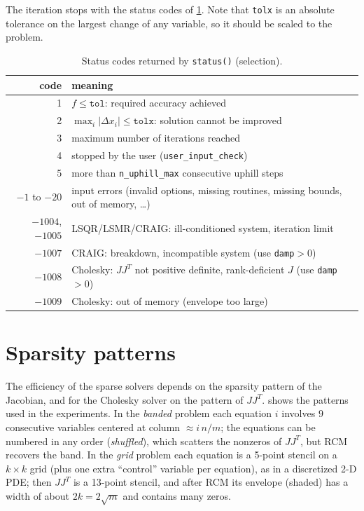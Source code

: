\documentclass[11pt]{article}
\newcommand{\code}[1]{\texttt{#1}}
\begin{document}
The iteration stops with the status codes of \cref{tab:status}. Note that \code{tolx} is an absolute
tolerance on the largest change of any variable, so it should be scaled to the problem.

\begin{table}[htbp]
\centering
\caption{Status codes returned by \code{status()} (selection).}
\label{tab:status}
\small
\begin{tabular}{@{}rl@{}}
\toprule
code & meaning \\
\midrule
1 & $f \le \code{tol}$: required accuracy achieved \\
2 & $\max_i |\Delta x_i| \le \code{tolx}$: solution cannot be improved \\
3 & maximum number of iterations reached \\
4 & stopped by the user (\code{user\_input\_check}) \\
5 & more than \code{n\_uphill\_max} consecutive uphill steps \\
$-1$ to $-20$ & input errors (invalid options, missing routines, missing bounds, out of memory, \ldots) \\
$-1004$, $-1005$ & LSQR/LSMR/CRAIG: ill-conditioned system, iteration limit \\
$-1007$ & CRAIG: breakdown, incompatible system (use \code{damp}${}>0$) \\
$-1008$ & Cholesky: $JJ^T$ not positive definite, rank-deficient $J$ (use \code{damp}${}>0$) \\
$-1009$ & Cholesky: out of memory (envelope too large) \\
\bottomrule
\end{tabular}
\end{table}

\section{Sparsity patterns}
\label{sec:sparsity}

The efficiency of the sparse solvers depends on the sparsity pattern of the Jacobian, and for the
Cholesky solver on the pattern of $JJ^T$.  shows the patterns used in the experiments.
In the \emph{banded} problem each equation $i$ involves $9$ consecutive variables centered at column
$\approx i\, n/m$; the equations can be numbered in any order (\emph{shuffled}), which scatters the
nonzeros of $JJ^T$, but RCM recovers the band. In the \emph{grid} problem each equation is a 5-point
stencil on a $k \times k$ grid (plus one extra ``control'' variable per equation), as in a discretized
2-D PDE; then $JJ^T$ is a 13-point stencil, and after RCM its envelope (shaded) has a width of about
$2k = 2\sqrt{m}$ and contains many zeros.
\end{document}

